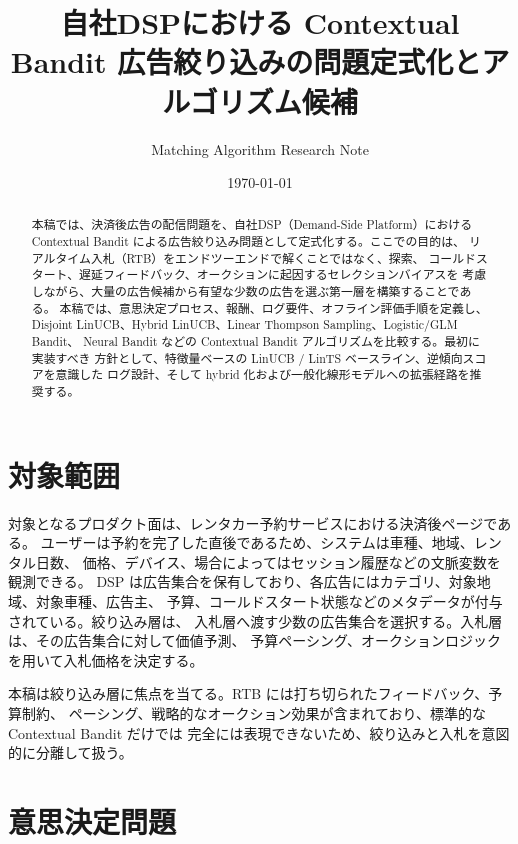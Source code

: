 \documentclass[uplatex,dvipdfmx,11pt,a4paper]{bxjsarticle}
\title{自社DSPにおける Contextual Bandit 広告絞り込みの問題定式化とアルゴリズム候補}
\author{Matching Algorithm Research Note}
\date{\today}
\begin{document}
\maketitle

\begin{abstract}
本稿では、決済後広告の配信問題を、自社DSP（Demand-Side Platform）における
Contextual Bandit による広告絞り込み問題として定式化する。ここでの目的は、
リアルタイム入札（RTB）をエンドツーエンドで解くことではなく、探索、
コールドスタート、遅延フィードバック、オークションに起因するセレクションバイアスを
考慮しながら、大量の広告候補から有望な少数の広告を選ぶ第一層を構築することである。
本稿では、意思決定プロセス、報酬、ログ要件、オフライン評価手順を定義し、
Disjoint LinUCB、Hybrid LinUCB、Linear Thompson Sampling、Logistic/GLM Bandit、
Neural Bandit などの Contextual Bandit アルゴリズムを比較する。最初に実装すべき
方針として、特徴量ベースの LinUCB / LinTS ベースライン、逆傾向スコアを意識した
ログ設計、そして hybrid 化および一般化線形モデルへの拡張経路を推奨する。
\end{abstract}

\section{対象範囲}
対象となるプロダクト面は、レンタカー予約サービスにおける決済後ページである。
ユーザーは予約を完了した直後であるため、システムは車種、地域、レンタル日数、
価格、デバイス、場合によってはセッション履歴などの文脈変数を観測できる。
DSP は広告集合を保有しており、各広告にはカテゴリ、対象地域、対象車種、広告主、
予算、コールドスタート状態などのメタデータが付与されている。絞り込み層は、
入札層へ渡す少数の広告集合を選択する。入札層は、その広告集合に対して価値予測、
予算ペーシング、オークションロジックを用いて入札価格を決定する。

本稿は絞り込み層に焦点を当てる。RTB には打ち切られたフィードバック、予算制約、
ペーシング、戦略的なオークション効果が含まれており、標準的な Contextual Bandit だけでは
完全には表現できないため、絞り込みと入札を意図的に分離して扱う。

\section{意思決定問題}
\end{document}

